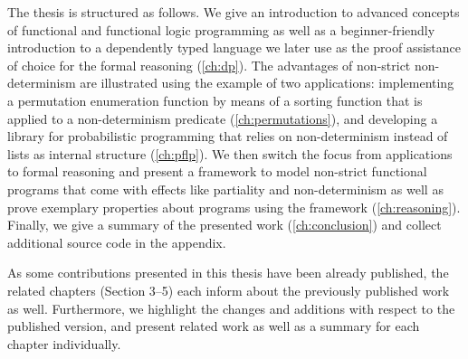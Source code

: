 The thesis is structured as follows. We give an introduction to advanced concepts of functional and functional logic programming as well as a beginner\--friendly introduction to a dependently typed language we later use as the proof assistance of choice for the formal reasoning (\autoref{ch:dp}).
The advantages of non\--strict non\--determinism are illustrated using the example of two applications: implementing a permutation enumeration function by means of a sorting function that is applied to a non\--determinism predicate (\autoref{ch:permutations}), and developing a library for probabilistic programming that relies on non\--determinism instead of lists as internal structure (\autoref{ch:pflp}).
We then switch the focus from applications to formal reasoning and present a framework to model non\--strict functional programs that come with effects like partiality and non\--determinism as well as prove exemplary properties about programs using the framework (\autoref{ch:reasoning}).
Finally, we give a summary of the presented work (\autoref{ch:conclusion}) and collect additional source code in the appendix.

As some contributions presented in this thesis have been already published, the related chapters (Section 3--5) each inform about the previously published work as well.
Furthermore, we highlight the changes and additions with respect to the published version, and present related work as well as a summary for each chapter individually.